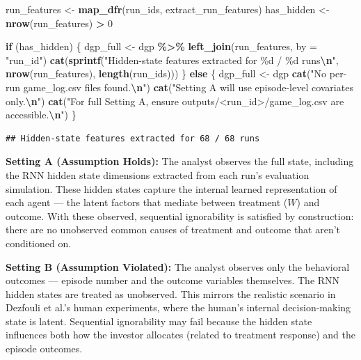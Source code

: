 \documentclass[
]{article}
\newenvironment{Shaded}{\begin{snugshade}}{\end{snugshade}}
\newcommand{\AttributeTok}[1]{\textcolor[rgb]{0.13,0.29,0.53}{#1}}
\newcommand{\ControlFlowTok}[1]{\textcolor[rgb]{0.13,0.29,0.53}{\textbf{#1}}}
\newcommand{\DecValTok}[1]{\textcolor[rgb]{0.00,0.00,0.81}{#1}}
\newcommand{\FunctionTok}[1]{\textcolor[rgb]{0.13,0.29,0.53}{\textbf{#1}}}
\newcommand{\NormalTok}[1]{#1}
\newcommand{\OtherTok}[1]{\textcolor[rgb]{0.56,0.35,0.01}{#1}}
\newcommand{\SpecialCharTok}[1]{\textcolor[rgb]{0.81,0.36,0.00}{\textbf{#1}}}
\newcommand{\StringTok}[1]{\textcolor[rgb]{0.31,0.60,0.02}{#1}}
\begin{document}
\begin{Shaded}
\begin{Highlighting}[]
\NormalTok{run\_features }\OtherTok{\textless{}{-}} \FunctionTok{map\_dfr}\NormalTok{(run\_ids, extract\_run\_features)}
\NormalTok{has\_hidden }\OtherTok{\textless{}{-}} \FunctionTok{nrow}\NormalTok{(run\_features) }\SpecialCharTok{\textgreater{}} \DecValTok{0}

\ControlFlowTok{if}\NormalTok{ (has\_hidden) \{}
\NormalTok{  dgp\_full }\OtherTok{\textless{}{-}}\NormalTok{ dgp }\SpecialCharTok{\%\textgreater{}\%} \FunctionTok{left\_join}\NormalTok{(run\_features, }\AttributeTok{by =} \StringTok{"run\_id"}\NormalTok{)}
  \FunctionTok{cat}\NormalTok{(}\FunctionTok{sprintf}\NormalTok{(}\StringTok{"Hidden{-}state features extracted for \%d / \%d runs}\SpecialCharTok{\textbackslash{}n}\StringTok{"}\NormalTok{,}
              \FunctionTok{nrow}\NormalTok{(run\_features), }\FunctionTok{length}\NormalTok{(run\_ids)))}
\NormalTok{\} }\ControlFlowTok{else}\NormalTok{ \{}
\NormalTok{  dgp\_full }\OtherTok{\textless{}{-}}\NormalTok{ dgp}
  \FunctionTok{cat}\NormalTok{(}\StringTok{"No per{-}run game\_log.csv files found.}\SpecialCharTok{\textbackslash{}n}\StringTok{"}\NormalTok{)}
  \FunctionTok{cat}\NormalTok{(}\StringTok{"Setting A will use episode{-}level covariates only.}\SpecialCharTok{\textbackslash{}n}\StringTok{"}\NormalTok{)}
  \FunctionTok{cat}\NormalTok{(}\StringTok{"For full Setting A, ensure outputs/\textless{}run\_id\textgreater{}/game\_log.csv are accessible.}\SpecialCharTok{\textbackslash{}n}\StringTok{"}\NormalTok{)}
\NormalTok{\}}
\end{Highlighting}
\end{Shaded}

\begin{verbatim}
## Hidden-state features extracted for 68 / 68 runs
\end{verbatim}

\textbf{Setting A (Assumption Holds):} The analyst observes the full
state, including the RNN hidden state dimensions extracted from each
run's evaluation simulation. These hidden states capture the internal
learned representation of each agent --- the latent factors that mediate
between treatment (\(W\)) and outcome. With these observed, sequential
ignorability is satisfied by construction: there are no unobserved
common causes of treatment and outcome that aren't conditioned on.

\textbf{Setting B (Assumption Violated):} The analyst observes only the
behavioral outcomes --- episode number and the outcome variables
themselves. The RNN hidden states are treated as unobserved. This
mirrors the realistic scenario in Dezfouli et al.'s human experiments,
where the human's internal decision-making state is latent. Sequential
ignorability may fail because the hidden state influences both how the
investor allocates (related to treatment response) and the episode
outcomes.
\end{document}
